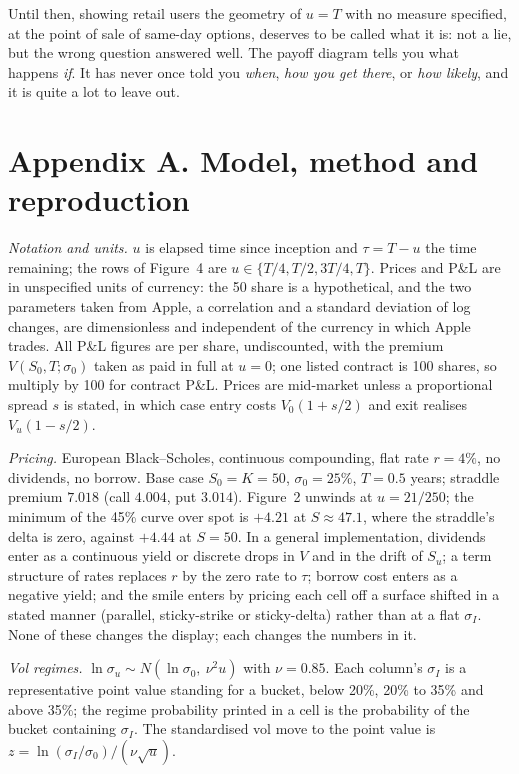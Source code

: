 \documentclass[11pt,a4paper]{article}
\newcommand{\PnL}{P\&L}
\begin{document}
Until then, showing retail users the geometry of $u = T$ with no measure specified, at the point of sale of same-day options, deserves to be called what it is: not a lie, but the wrong question answered well. The payoff diagram tells you what happens \emph{if}. It has never once told you \emph{when}, \emph{how you get there}, or \emph{how likely}, and it is quite a lot to leave out.

\section*{Appendix A. Model, method and reproduction}

\noindent \emph{Notation and units.} $u$ is elapsed time since inception and $\tau = T - u$ the time remaining; the rows of Figure~4 are $u \in \{T/4, T/2, 3T/4, T\}$. Prices and \PnL{} are in unspecified units of currency: the 50 share is a hypothetical, and the two parameters taken from Apple, a correlation and a standard deviation of log changes, are dimensionless and independent of the currency in which Apple trades. All \PnL{} figures are per share, undiscounted, with the premium $V(S_0,T;\sigma_0)$ taken as paid in full at $u = 0$; one listed contract is 100 shares, so multiply by 100 for contract \PnL{}. Prices are mid-market unless a proportional spread $s$ is stated, in which case entry costs $V_0(1+s/2)$ and exit realises $V_u(1-s/2)$.

\emph{Pricing.} European Black--Scholes, continuous compounding, flat rate $r = 4\%$, no dividends, no borrow. Base case $S_0 = K = 50$, $\sigma_0 = 25\%$, $T = 0.5$ years; straddle premium $7.018$ (call $4.004$, put $3.014$). Figure~2 unwinds at $u = 21/250$; the minimum of the 45\% curve over spot is $+4.21$ at $S \approx 47.1$, where the straddle's delta is zero, against $+4.44$ at $S = 50$. In a general implementation, dividends enter as a continuous yield or discrete drops in $V$ and in the drift of $S_u$; a term structure of rates replaces $r$ by the zero rate to $\tau$; borrow cost enters as a negative yield; and the smile enters by pricing each cell off a surface shifted in a stated manner (parallel, sticky-strike or sticky-delta) rather than at a flat $\sigma_I$. None of these changes the display; each changes the numbers in it.

\emph{Vol regimes.} $\ln\sigma_u \sim N(\ln\sigma_0,\ \nu^2 u)$ with $\nu = 0.85$. Each column's $\sigma_I$ is a representative point value standing for a bucket, below 20\%, 20\% to 35\% and above 35\%; the regime probability printed in a cell is the probability of the bucket containing $\sigma_I$. The standardised vol move to the point value is $z = \ln(\sigma_I/\sigma_0)/(\nu\sqrt{u})$.
\end{document}
